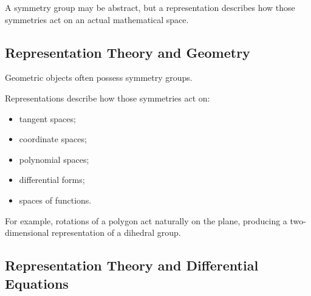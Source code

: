 A symmetry group may be abstract, but a representation describes how those
symmetries act on an actual mathematical space.

\begin{center}
\end{center}

\subsection{Representation Theory and Geometry}
\label{subsec:representation-geometry}

Geometric objects often possess symmetry groups.

Representations describe how those symmetries act on:

\begin{itemize}
    \item tangent spaces;
    \item coordinate spaces;
    \item polynomial spaces;
    \item differential forms;
    \item spaces of functions.
\end{itemize}

For example, rotations of a polygon act naturally on the plane, producing a
two-dimensional representation of a dihedral group.

\subsection{Representation Theory and Differential Equations}
\label{subsec:representation-differential-equations}

